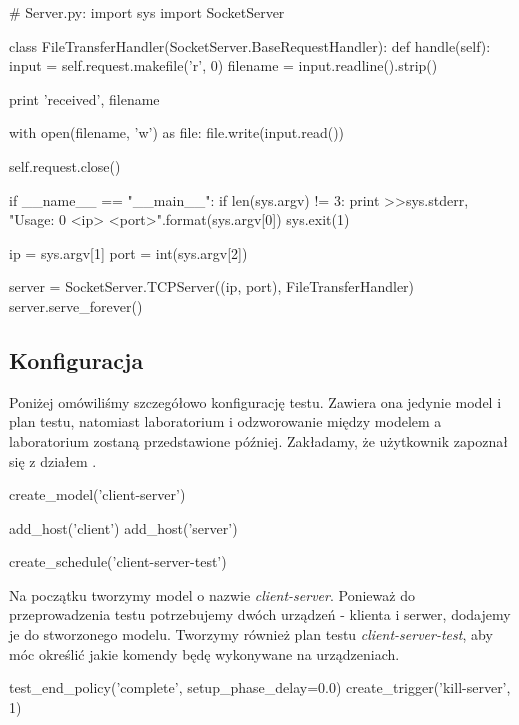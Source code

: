 \documentclass[00-praca-magisterska.tex]{subfiles}
\begin{document}
\begin{pythoncode}
  # Server.py:
  import sys
  import SocketServer

  class FileTransferHandler(SocketServer.BaseRequestHandler):
      def handle(self):
          input  = self.request.makefile('r', 0)
          filename = input.readline().strip()

          print 'received', filename

          with open(filename, 'w') as file:
	      file.write(input.read())
  
          self.request.close()

  if __name__ == "__main__":
      if len(sys.argv) != 3:
          print >>sys.stderr, "Usage: {0} <ip> <port>".format(sys.argv[0])
          sys.exit(1)

      ip = sys.argv[1]
      port = int(sys.argv[2])

      server = SocketServer.TCPServer((ip, port), FileTransferHandler)
      server.serve_forever()

\end{pythoncode}

\subsection{Konfiguracja}

Poniżej omówiliśmy szczegółowo konfigurację testu. Zawiera ona jedynie model i
plan testu, natomiast laboratorium i odzworowanie między modelem a laboratorium
zostaną przedstawione później. Zakładamy, że użytkownik zapoznał się z działem
.

\begin{pythoncode}
  create_model('client-server')

  add_host('client')
  add_host('server')

  create_schedule('client-server-test')
\end{pythoncode}

Na początku tworzymy model o nazwie \emph{client-server}. Ponieważ do
przeprowadzenia testu potrzebujemy dwóch urządzeń - klienta i serwer, dodajemy
je do stworzonego modelu. Tworzymy również plan testu \emph{client-server-test},
aby móc określić jakie komendy będę wykonywane na urządzeniach.

\begin{pythoncode}
  test_end_policy('complete', setup_phase_delay=0.0)
  create_trigger('kill-server', 1)
\end{pythoncode}
\end{document}
